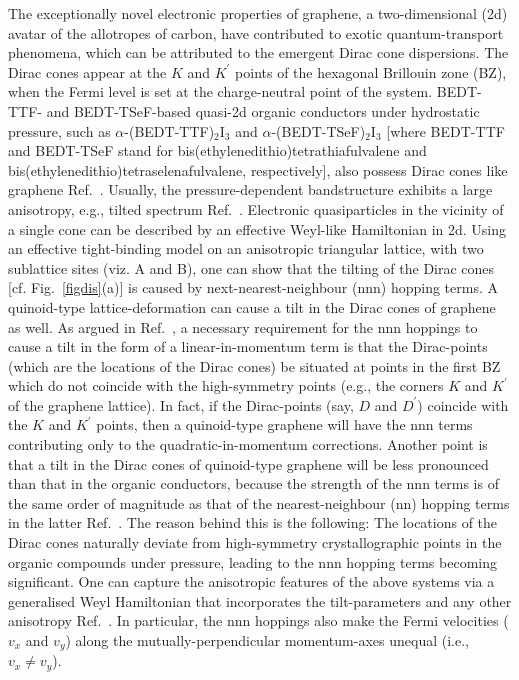 \documentclass[aps,prb, onecolumn, nofootinbib, citeautoscript,10pt]{revtex4-2}
\begin{document}
The exceptionally novel electronic properties of graphene, a two-dimensional (2d) avatar of the allotropes of carbon, have contributed to exotic quantum-transport phenomena, which can be attributed to the emergent Dirac cone dispersions. The Dirac cones appear at the $K$ and $K^\prime $ points of the hexagonal Brillouin zone (BZ), when the Fermi level is set at the charge-neutral point of the system. BEDT-TTF- and BEDT-TSeF-based quasi-2d organic conductors under hydrostatic pressure, such as $\alpha$-(BEDT-TTF)$_2$I$_3$ and $\alpha$-(BEDT-TSeF)$_2$I$_3$ [where BEDT-TTF and BEDT-TSeF stand for bis(ethylenedithio)tetrathiafulvalene and bis(ethylenedithio)tetraselenafulvalene, respectively], also possess Dirac cones like graphene Ref.~\cite{organic-tilted-dirac, organic-dirac}. Usually, the pressure-dependent bandstructure exhibits a large anisotropy, e.g., tilted spectrum Ref.~\cite{organic-tilted-dirac}. Electronic quasiparticles in the vicinity of a single cone can be described by an effective Weyl-like Hamiltonian in 2d. Using an effective tight-binding model on an anisotropic triangular lattice, with two sublattice sites (viz. A and B), one can show that the tilting of the Dirac cones [cf. Fig.~\ref{figdis}(a)] is caused by next-nearest-neighbour (nnn) hopping terms. A quinoid-type lattice-deformation can cause a tilt in the Dirac cones of graphene as well. As argued in Ref.~\cite{tilted-goerbig}, a necessary requirement for the nnn hoppings to cause a tilt in the form of a linear-in-momentum term is that the Dirac-points (which are the locations of the Dirac cones) be situated at points in the first BZ which do not coincide with the high-symmetry points (e.g., the corners $K$ and $K^\prime$ of the graphene lattice). In fact, if the Dirac-points (say, $D$ and $D^\prime $) coincide with the $K$ and $K^\prime$ points, then a quinoid-type graphene will have the nnn terms contributing only to the quadratic-in-momentum corrections.
Another point is that a tilt in the Dirac cones of quinoid-type graphene will be less pronounced than that in the organic conductors, because the strength of the nnn terms is of the same order of magnitude as that of the nearest-neighbour (nn) hopping terms in the latter Ref.~\cite{tilted-goerbig}. The reason behind this is the following: The locations of the Dirac cones naturally deviate from high-symmetry crystallographic points in the organic compounds under pressure, leading to the nnn hopping terms becoming significant. One can capture the anisotropic features of the above systems via a generalised Weyl Hamiltonian that incorporates the tilt-parameters and any other anisotropy Ref.~\cite{tilted-goerbig-plasmons, strained-dirac-franz, ips_tilted_dirac}. In particular, the nnn hoppings also make the Fermi velocities ($v_x $ and $ v_y$) along the mutually-perpendicular momentum-axes unequal (i.e., $ v_x \neq v_y$).
\end{document}
